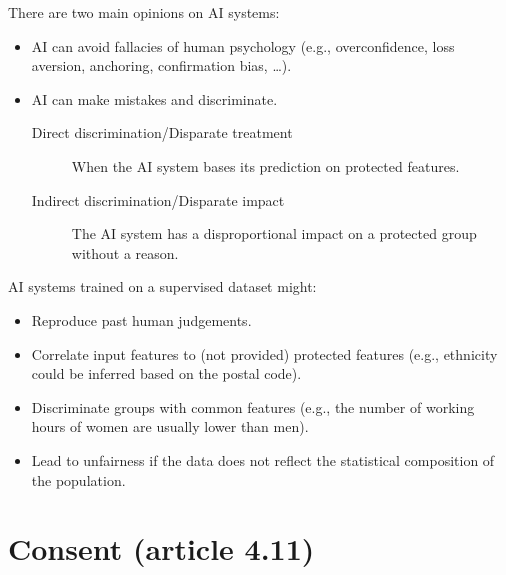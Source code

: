 There are two main opinions on AI systems:
\begin{itemize}
    \item AI can avoid fallacies of human psychology (e.g., overconfidence, loss aversion, anchoring, confirmation bias, \dots).
    \item AI can make mistakes and discriminate.
    \begin{description}
        \item[Direct discrimination/Disparate treatment]
            When the AI system bases its prediction on protected features.
        \item[Indirect discrimination/Disparate impact] 
            The AI system has a disproportional impact on a protected group without a reason.
    \end{description}
\end{itemize}

\begin{remark}
    AI systems trained on a supervised dataset might:
    \begin{itemize}
        \item Reproduce past human judgements.
        \item Correlate input features to (not provided) protected features (e.g., ethnicity could be inferred based on the postal code).
        \item Discriminate groups with common features (e.g., the number of working hours of women are usually lower than men).
        \item Lead to unfairness if the data does not reflect the statistical composition of the population.
    \end{itemize}
\end{remark}



\section{Consent (article 4.11)}

